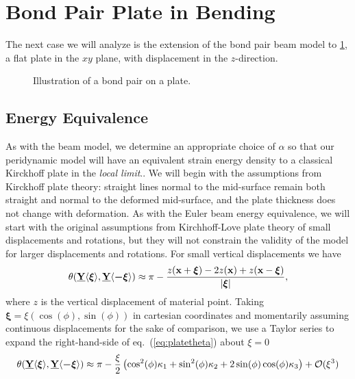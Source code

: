 \section{Bond Pair Plate in Bending}
The next case we will analyze is the extension of the bond pair beam model to \cref{fig:BondPairPlate}, a flat plate in the \(xy\) plane, with displacement in the \(z\)-direction. 
%
\begin{figure}[tbp]
    \centering
    \caption{Illustration of a bond pair on a plate.}
    \label{fig:BondPairPlate}
\end{figure}
%

\subsection{Energy Equivalence}
%
As with the beam model, we determine an appropriate choice of $\alpha$ so that our peridynamic model will have an equivalent strain energy density to a classical Kirckhoff plate in the \emph{local limit}..  We will begin with the assumptions from Kirckhoff plate theory: straight lines normal to the mid-surface remain both straight and normal to the deformed mid-surface, and the plate thickness does not change with deformation.  As with the Euler beam energy equivalence, we will start with the original assumptions from Kirchhoff-Love plate theory of small displacements and rotations, but they will not constrain the validity of the model for larger displacements and rotations.  For small vertical displacements we have
%
\begin{equation}
    \theta(\vstate{Y}{}{\boldsymbol{\xi}},\vstate{Y}{}{\boldsymbol{-\xi}}) \approx \pi-\frac{z(\mathbf{x}+\boldsymbol{\xi})-2z(\mathbf{x})+z(\mathbf{x}-\boldsymbol{\xi})}{|\boldsymbol{\xi}|},
    \label{eq:platetheta}
\end{equation}
%
where $z$ is the vertical displacement of material point.  Taking \(\boldsymbol{\xi}=\xi (\cos(\phi),\sin(\phi))\) in cartesian coordinates and momentarily assuming continuous displacements for the sake of comparison, we use a Taylor series to expand the right-hand-side of eq.~(\ref{eq:platetheta}) about \(\xi = 0\) 
%
\begin{equation}
    \theta(\vstate{Y}{}{\boldsymbol{\xi}},\vstate{Y}{}{\boldsymbol{-\xi}}) \approx \pi-\frac{\xi}{2} \left(\cos^2(\phi) \kappa_1+\sin^2(\phi) \kappa_2+2\sin(\phi)\cos(\phi)\kappa_3\right)+\mathcal{O}(\xi^3)
    \label{eq:platetheta2}
\end{equation}
